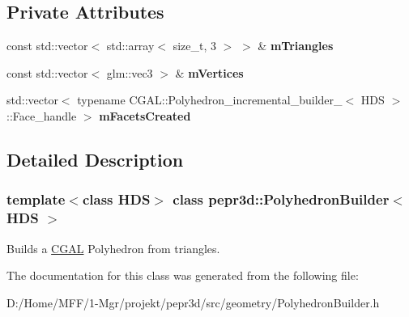 \subsection*{Private Attributes}
\begin{DoxyCompactItemize}
\item 
\mbox{\label{classpepr3d_1_1_polyhedron_builder_a02210edd1e8feb52442b2b97178c52f6}} 
const std\+::vector$<$ std\+::array$<$ size\+\_\+t, 3 $>$ $>$ \& {\bfseries m\+Triangles}
\item 
\mbox{\label{classpepr3d_1_1_polyhedron_builder_adab85375d426f5864e0aae328e1d27d9}} 
const std\+::vector$<$ glm\+::vec3 $>$ \& {\bfseries m\+Vertices}
\item 
\mbox{\label{classpepr3d_1_1_polyhedron_builder_a0c79d591a3234af3fad03d8cd133e467}} 
std\+::vector$<$ typename C\+G\+A\+L\+::\+Polyhedron\+\_\+incremental\+\_\+builder\+\_$<$ H\+DS $>$\+::Face\+\_\+handle $>$ {\bfseries m\+Facets\+Created}
\end{DoxyCompactItemize}


\subsection{Detailed Description}
\subsubsection*{template$<$class H\+DS$>$\newline
class pepr3d\+::\+Polyhedron\+Builder$<$ H\+D\+S $>$}

Builds a \mbox{\hyperlink{namespace_c_g_a_l}{C\+G\+AL}} Polyhedron from triangles. 

The documentation for this class was generated from the following file\+:\begin{DoxyCompactItemize}
\item 
D\+:/\+Home/\+M\+F\+F/1-\/\+Mgr/projekt/pepr3d/src/geometry/Polyhedron\+Builder.\+h\end{DoxyCompactItemize}
